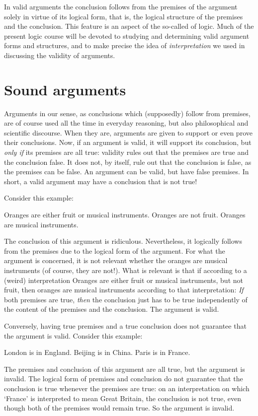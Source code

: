 In valid arguments the conclusion follows from the premises of the argument solely in virtue of its logical form, that is, the logical structure of the premises and the conclusion. This feature is an aspect of the so-called  of logic. Much of the present logic course will be devoted to studying and determining valid argument forms and structures, and to make precise the idea of \emph{interpretation} we used in discussing the validity of arguments.

\section{Sound arguments}

Arguments in our sense, as conclusions which (supposedly) follow from premises, are of course used all the time in everyday reasoning, but also philosophical and scientific discourse. When they are, arguments are given to support or even prove their conclusions. Now, if an argument is valid, it will support its conclusion, but \emph{only if} its premises are all true: validity rules out that the premises are true and the conclusion false. It does not, by itself, rule out that the conclusion is false, as the premises can be false. An argument can be valid, but have false premises. In short, a  valid argument may have a conclusion that is not true!

Consider this example:
	\begin{earg}
		\prem Oranges are either fruit or musical instruments.
		\prem Oranges are not fruit.
		\conc Oranges are musical instruments.
	\end{earg}
The conclusion of this argument is ridiculous. Nevertheless, it logically follows from the premises due to the logical form of the argument. For what the argument is concerned, it is not relevant whether the oranges are musical instruments (of course, they are not!). What is relevant is that if according to a (weird) interpretation Oranges are either fruit or musical instruments, but not fruit, then oranges are musical instruments according to that interpretation: \emph{If} both premises are true, \emph{then} the conclusion just has to be true independently of the content of the premises and the conclusion. The argument is valid.

Conversely, having true premises and a true conclusion does not guarantee that the argument is valid. Consider this example:
	\begin{earg}
		\prem London is in England.
		\prem Beijing is in China.
		\conc Paris is in France.
	\end{earg}
The premises and conclusion of this argument are all true, but the argument is invalid. The logical form of premises and conclusion do not guarantee that the conclusion is true whenever the premises are true: on an interpretation on which  `France' is interpreted to mean Great Britain, the conclusion is not true, even though both of the premises would remain true. So the argument is invalid.

